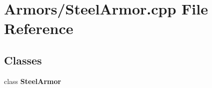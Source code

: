\section{Armors/\-Steel\-Armor.cpp File Reference}
\label{_steel_armor_8cpp}
\subsection*{Classes}
\begin{DoxyCompactItemize}
\item 
class {\bf Steel\-Armor}
\end{DoxyCompactItemize}
